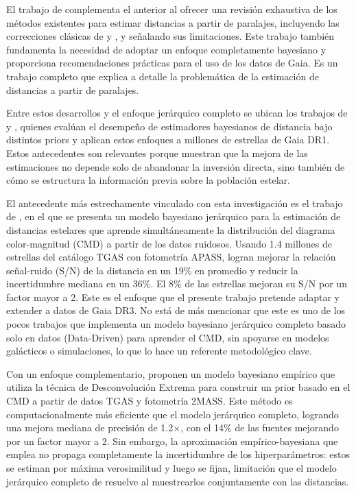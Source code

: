 \documentclass[stu, 12pt, letterpaper, donotrepeattitle, floatsintext, natbib]{apa7_ula}
\begin{document}
El trabajo de \citet{luri2018gaia} complementa el anterior al ofrecer
una revisión exhaustiva de los métodos existentes para estimar distancias
a partir de paralajes, incluyendo las correcciones clásicas de
\citet{Lutz_Kelker_1973} y \citet{Smith_Eichhorn_1996}, y señalando
sus limitaciones. Este trabajo también fundamenta la necesidad de
adoptar un enfoque completamente bayesiano y proporciona recomendaciones
prácticas para el uso de los datos de Gaia. Es un trabajo completo
que explica a detalle la problemática de la estimación de distancias a partir de paralajes.

Entre estos desarrollos y el enfoque jerárquico completo se ubican los
trabajos de \citet{Astraatmadja_BailerJones_2016a} y
\citet{Astraatmadja_BailerJones_2016b}, quienes evalúan el desempeño
de estimadores bayesianos de distancia bajo distintos priors y aplican
estos enfoques a millones de estrellas de Gaia DR1. Estos antecedentes
son relevantes porque muestran que la mejora de las estimaciones no
depende solo de abandonar la inversión directa, sino también de cómo se
estructura la información previa sobre la población estelar.

El antecedente más estrechamente vinculado con esta investigación es
el trabajo de \citet{Leistedt_2017}, en el que se presenta un modelo bayesiano
jerárquico para la estimación de distancias estelares que aprende
simultáneamente la distribución del diagrama color-magnitud (CMD)
a partir de los datos ruidosos. Usando 1.4 millones de estrellas
del catálogo TGAS con fotometría APASS, logran mejorar la relación
señal-ruido (S/N) de la distancia en un 19\% en promedio y reducir
la incertidumbre mediana en un 36\%. El 8\% de las estrellas mejoran
su S/N por un factor mayor a 2. Este es el enfoque que el presente
trabajo pretende adaptar y extender a datos de Gaia DR3. No está de más
mencionar que este es uno de los pocos trabajos que implementa un modelo
bayesiano jerárquico completo basado solo en datos (Data-Driven) para aprender el CMD,
sin apoyarse en modelos galácticos o simulaciones,
lo que lo hace un referente metodológico clave.

Con un enfoque complementario, \citet{Anderson_2017} proponen un
modelo bayesiano empírico que utiliza la técnica de Desconvolución
Extrema \citep[XD,][]{Bovy_2011} para construir un prior basado
en el CMD a partir de datos TGAS y fotometría 2MASS. Este método es computacionalmente
más eficiente que el modelo jerárquico completo, logrando una mejora
mediana de precisión de 1.2$\times$, con el 14\% de las fuentes
mejorando por un factor mayor a 2. Sin embargo, la aproximación
empírico-bayesiana que emplea no propaga completamente la
incertidumbre de los hiperparámetros: estos se estiman por máxima
verosimilitud y luego se fijan, limitación que el modelo jerárquico
completo de \citet{Leistedt_2017} resuelve al muestrearlos
conjuntamente con las distancias.
\end{document}
